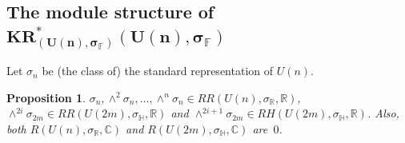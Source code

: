 \documentclass[11pt]{article}
\numberwithin{equation}{section}
\newtheorem{Proposition}[Theorem]{Proposition}
{\theoremstyle{definition}
\newtheorem{Definition}[Theorem]{Definition}
\newtheorem{Example}[Theorem]{Example}
\newtheorem{Remark}[Theorem]{Remark}
}
\begin{document}
\subsection[The module structure of $KR^*_{(U(n), \sigma_\mathbb{F})}(U(n),\sigma_\mathbb{F})$]{The
module structure of $\boldsymbol{KR^*_{(U(n), \sigma_\mathbb{F})}(U(n),\sigma_\mathbb{F})}$}

\begin{Definition}
Let $\sigma_n$ be (the class of) the standard representation of $U(n)$.
\end{Definition}

\begin{Proposition}
\label{realrepunitary}
$\sigma_n,\wedge^2\sigma_n, \dots, \wedge^n\sigma_n\in RR(U(n), \sigma_\mathbb{R}, \mathbb{R})$, $\wedge^{2i}
\sigma_{2m}
\in RR(U(2m),
\sigma_\mathbb{H}, \mathbb{R})$ and $\wedge^{2i+1}
\sigma_{2m}
\in RH(U(2m),
\sigma_\mathbb{H}, \mathbb{R})$.
Also, both $R(U(n),
\sigma_\mathbb{R}, \mathbb{C})$ and $R(U(2m),
\sigma_\mathbb{H}, \mathbb{C})$ are~$0$.
\end{Proposition}
\end{document}
